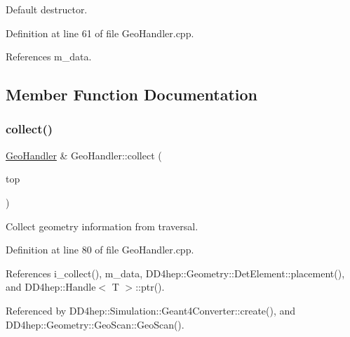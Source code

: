 Default destructor. 



Definition at line 61 of file Geo\+Handler.\+cpp.



References m\+\_\+data.



\subsection{Member Function Documentation}
\hypertarget{class_d_d4hep_1_1_geometry_1_1_geo_handler_acdff622f718b2f71d40744f4665b80e9}{}\label{class_d_d4hep_1_1_geometry_1_1_geo_handler_acdff622f718b2f71d40744f4665b80e9} 
\subsubsection{\texorpdfstring{collect()}{collect()}\hspace{0.1cm}{\footnotesize\ttfamily [1/2]}}
{\footnotesize\ttfamily \hyperlink{class_d_d4hep_1_1_geometry_1_1_geo_handler}{Geo\+Handler} \& Geo\+Handler\+::collect (\begin{DoxyParamCaption}\item[{\hyperlink{class_d_d4hep_1_1_geometry_1_1_det_element}{Det\+Element}}]{top }\end{DoxyParamCaption})}



Collect geometry information from traversal. 



Definition at line 80 of file Geo\+Handler.\+cpp.



References i\+\_\+collect(), m\+\_\+data, D\+D4hep\+::\+Geometry\+::\+Det\+Element\+::placement(), and D\+D4hep\+::\+Handle$<$ T $>$\+::ptr().



Referenced by D\+D4hep\+::\+Simulation\+::\+Geant4\+Converter\+::create(), and D\+D4hep\+::\+Geometry\+::\+Geo\+Scan\+::\+Geo\+Scan().

\hypertarget{class_d_d4hep_1_1_geometry_1_1_geo_handler_a807765ba56e60835ab300a906d008f07}{}\label{class_d_d4hep_1_1_geometry_1_1_geo_handler_a807765ba56e60835ab300a906d008f07} 
